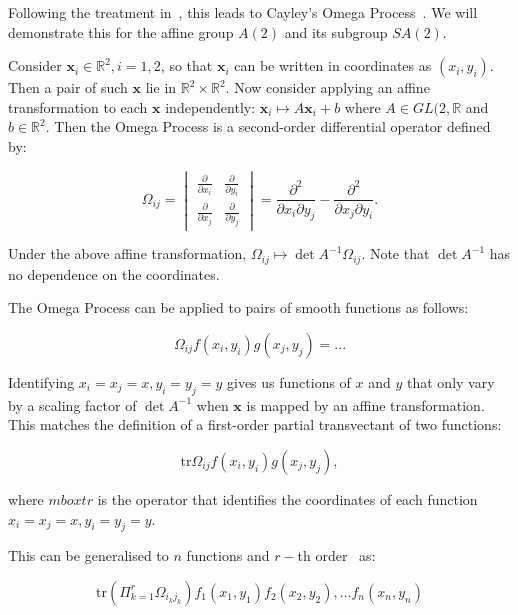 \documentclass[review,onefignum,onetabnum]{siamonline190516}
\begin{document}
Following the treatment in~\cite{OlverCIT}, this leads to Cayley's Omega Process~\cite{Cayley}. We will demonstrate this for the affine group $A(2)$ and its subgroup $SA(2)$. 


Consider $\mathbf{x}_i \in \mathbb{R}^2, i=1,2$, so that $\mathbf{x}_i$ can be written in coordinates as $(x_i, y_i)$. Then a pair of such $\mathbf{x}$ lie in $\mathbb{R}^2 \times \mathbb{R}^2$.  Now consider applying an affine transformation to each $\mathbf{x}$ independently: $\mathbf{x}_i \mapsto A \mathbf{x}_i + b$ where $A \in GL(2,\mathbb{R}$ and $b \in \mathbb{R}^2$. Then the Omega Process is a second-order differential operator defined by:

\begin{equation}
\Omega_{ij} = \begin{vmatrix} \frac{\partial}{\partial x_i} & \frac{\partial}{\partial y_i} \\ \frac{\partial}{\partial x_j} & \frac{\partial}{\partial y_j} \end{vmatrix}  = \frac{\partial^2}{\partial x_i \partial y_j} - \frac{\partial^2}{\partial x_j \partial y_i}.
\end{equation}

Under the above affine transformation, $\Omega_{ij} \mapsto \det A^{-1} \Omega_{ij}$. Note that $\det A^{-1}$ has no dependence on the coordinates. 

The Omega Process can be applied to pairs of smooth functions as follows:

\begin{equation}
\Omega_{ij} f(x_i, y_i) g(x_j, y_j) = ...
\end{equation}

Identifying $x_i = x_j = x, y_i = y_j = y$ gives us functions of $x$ and $y$ that only vary by a scaling factor of $\det A^{-1}$ when $\mathbf{x}$ is mapped by an affine transformation. This matches the definition of a first-order partial transvectant of two functions:

\begin{equation}
\mbox{tr} \Omega_{ij} f(x_i, y_i) g(x_j, y_j),
\end{equation}

\noindent where $mbox{tr}$  is the operator that identifies the coordinates of each function $x_i = x_j = x, y_i = y_j = y$.

This can be generalised to $n$ functions and $r-$th order~\cite{Olver} as:

\begin{equation}
\mbox{tr} \left( \Pi_{k=1}^r \Omega_{i_k j_k} \right) f_1(x_1, y_1) f_2(x_2, y_2), \ldots f_n (x_n, y_n)
\end{equation}
\end{document}
